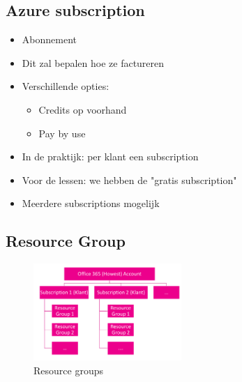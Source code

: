 \documentclass{article}
\begin{document}
\subsection{Azure subscription}
\begin{itemize}
    \item Abonnement
    \item Dit zal bepalen hoe ze factureren
    \item Verschillende opties:
    \begin{itemize}
        \item Credits op voorhand
        \item Pay by use
    \end{itemize}
    \item In de praktijk: per klant een subscription
    \item Voor de lessen: we hebben de "gratis subscription"
    \item Meerdere subscriptions mogelijk
\end{itemize}

\subsection{Resource Group}

\begin{figure}[H]
    \centering
    \includegraphics[width=0.5\textwidth]{resource-group.png}
    \caption{Resource groups}
\end{figure}
\end{document}
